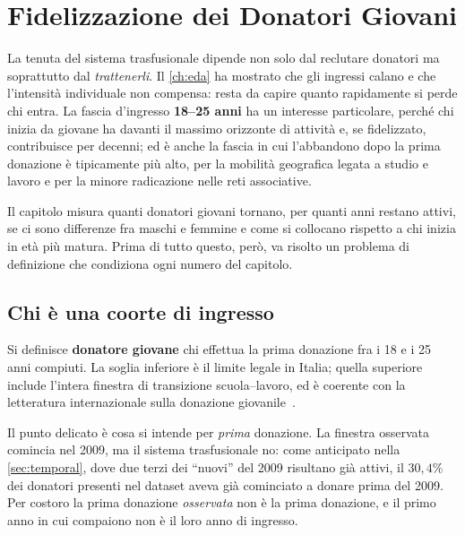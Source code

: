 
\chapter{Fidelizzazione dei Donatori Giovani}
\label{ch:retention}

La tenuta del sistema trasfusionale dipende non solo dal reclutare donatori ma
soprattutto dal \emph{trattenerli}. Il \cref{ch:eda} ha mostrato che gli
ingressi calano e che l'intensità individuale non compensa: resta da capire
quanto rapidamente si perde chi entra. La fascia d'ingresso \textbf{18--25
anni} ha un interesse particolare, perché chi inizia da giovane ha davanti il
massimo orizzonte di attività e, se fidelizzato, contribuisce per decenni; ed è
anche la fascia in cui l'abbandono dopo la prima donazione è tipicamente più
alto, per la mobilità geografica legata a studio e lavoro e per la minore
radicazione nelle reti associative.

Il capitolo misura quanti donatori giovani tornano, per quanti anni restano
attivi, se ci sono differenze fra maschi e femmine e come si collocano rispetto
a chi inizia in età più matura. Prima di tutto questo, però, va risolto un
problema di definizione che condiziona ogni numero del capitolo.

\section{Chi è una coorte di ingresso}
\label{sec:ret_def}

Si definisce \textbf{donatore giovane} chi effettua la prima donazione fra i 18
e i 25 anni compiuti. La soglia inferiore è il limite legale in Italia; quella
superiore include l'intera finestra di transizione scuola--lavoro, ed è
coerente con la letteratura internazionale sulla donazione
giovanile~\cite{Maghsudlu2017}.

Il punto delicato è cosa si intende per \emph{prima} donazione. La finestra
osservata comincia nel 2009, ma il sistema trasfusionale no: come anticipato
nella \cref{sec:temporal}, dove due terzi dei ``nuovi'' del 2009 risultano già
attivi, il $30{,}4\%$ dei donatori presenti nel dataset aveva già cominciato a
donare prima del 2009. Per costoro la prima donazione
\emph{osservata} non è la prima donazione, e il primo anno in cui compaiono non
è il loro anno di ingresso.

